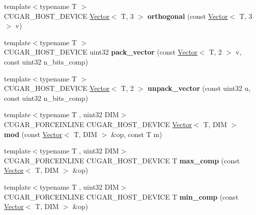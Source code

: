 \begin{DoxyCompactItemize}
\item 
\mbox{\label{namespacecugar_a1c8f1fdfc09c78ad50f73014df8294ab}} 
{\footnotesize template$<$typename T $>$ }\\C\+U\+G\+A\+R\+\_\+\+H\+O\+S\+T\+\_\+\+D\+E\+V\+I\+CE \hyperlink{structcugar_1_1_vector}{Vector}$<$ T, 3 $>$ {\bfseries orthogonal} (const \hyperlink{structcugar_1_1_vector}{Vector}$<$ T, 3 $>$ v)
\item 
\mbox{\label{namespacecugar_a495d21bcccda2d254f609dcdbe92d356}} 
{\footnotesize template$<$typename T $>$ }\\C\+U\+G\+A\+R\+\_\+\+H\+O\+S\+T\+\_\+\+D\+E\+V\+I\+CE uint32 {\bfseries pack\+\_\+vector} (const \hyperlink{structcugar_1_1_vector}{Vector}$<$ T, 2 $>$ v, const uint32 n\+\_\+bits\+\_\+comp)
\item 
\mbox{\label{namespacecugar_a75175f5a5670ee0db36149b5d45bdb00}} 
{\footnotesize template$<$typename T $>$ }\\C\+U\+G\+A\+R\+\_\+\+H\+O\+S\+T\+\_\+\+D\+E\+V\+I\+CE \hyperlink{structcugar_1_1_vector}{Vector}$<$ T, 2 $>$ {\bfseries unpack\+\_\+vector} (const uint32 u, const uint32 n\+\_\+bits\+\_\+comp)
\item 
\mbox{\label{namespacecugar_ac57d5755f72fc26edfb5ef8487a51008}} 
{\footnotesize template$<$typename T , uint32 D\+IM$>$ }\\C\+U\+G\+A\+R\+\_\+\+F\+O\+R\+C\+E\+I\+N\+L\+I\+NE C\+U\+G\+A\+R\+\_\+\+H\+O\+S\+T\+\_\+\+D\+E\+V\+I\+CE \hyperlink{structcugar_1_1_vector}{Vector}$<$ T, D\+IM $>$ {\bfseries mod} (const \hyperlink{structcugar_1_1_vector}{Vector}$<$ T, D\+IM $>$ \&op, const T m)
\item 
\mbox{\label{namespacecugar_afe6257106fa226ebb94ad87f6778a067}} 
{\footnotesize template$<$typename T , uint32 D\+IM$>$ }\\C\+U\+G\+A\+R\+\_\+\+F\+O\+R\+C\+E\+I\+N\+L\+I\+NE C\+U\+G\+A\+R\+\_\+\+H\+O\+S\+T\+\_\+\+D\+E\+V\+I\+CE T {\bfseries max\+\_\+comp} (const \hyperlink{structcugar_1_1_vector}{Vector}$<$ T, D\+IM $>$ \&op)
\item 
\mbox{\label{namespacecugar_a043714c1d4f682ba2fc02d742ba91aa8}} 
{\footnotesize template$<$typename T , uint32 D\+IM$>$ }\\C\+U\+G\+A\+R\+\_\+\+F\+O\+R\+C\+E\+I\+N\+L\+I\+NE C\+U\+G\+A\+R\+\_\+\+H\+O\+S\+T\+\_\+\+D\+E\+V\+I\+CE T {\bfseries min\+\_\+comp} (const \hyperlink{structcugar_1_1_vector}{Vector}$<$ T, D\+IM $>$ \&op)

\end{DoxyCompactItemize}
